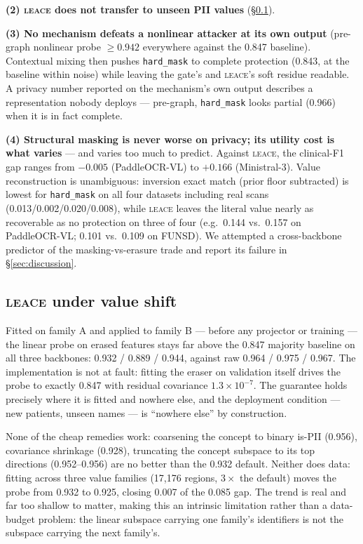 \documentclass[11pt]{article}
\newcommand{\hardmask}{\texttt{hard\_mask}}
\newcommand{\leace}{\textsc{leace}}
\begin{document}
\textbf{(2) \leace{} does not transfer to unseen PII values}
(\S\ref{sec:leacetransfer}).

\textbf{(3) No mechanism defeats a nonlinear attacker at its own output}
(pre-graph nonlinear probe $\geq 0.942$ everywhere against the 0.847
baseline). Contextual mixing then pushes \hardmask{} to complete protection
(0.843, at the baseline within noise) while leaving the gate's and
\leace{}'s soft residue readable. A privacy number reported on the
mechanism's own output describes a representation nobody deploys ---
pre-graph, \hardmask{} looks partial (0.966) when it is in fact complete.

\textbf{(4) Structural masking is never worse on privacy; its utility cost
is what varies} --- and varies too much to predict. Against \leace{}, the
clinical-F1 gap ranges from $-0.005$ (PaddleOCR-VL) to $+0.166$
(Ministral-3). Value reconstruction is unambiguous: inversion exact match
(prior floor subtracted) is lowest for \hardmask{} on all four datasets
including real scans (0.013/0.002/0.020/0.008), while \leace{} leaves the
literal value nearly as recoverable as no protection on three of four
(e.g.\ 0.144 vs.\ 0.157 on PaddleOCR-VL; 0.101 vs.\ 0.109 on FUNSD). We
attempted a cross-backbone predictor of the masking-vs-erasure trade and
report its failure in \S\ref{sec:discussion}.

\subsection{\leace{} under value shift}\label{sec:leacetransfer}

Fitted on family A and applied to family B --- before any projector or
training --- the linear probe on erased features stays far above the 0.847
majority baseline on all three backbones: 0.932 / 0.889 / 0.944, against raw
0.964 / 0.975 / 0.967. The implementation is not at fault: fitting the
eraser on validation itself drives the probe to exactly 0.847 with residual
covariance $1.3\times10^{-7}$. The guarantee holds precisely where it is
fitted and nowhere else, and the deployment condition --- new patients,
unseen names --- is ``nowhere else'' by construction.

None of the cheap remedies work: coarsening the concept to binary is-PII
(0.956), covariance shrinkage (0.928), truncating the concept subspace to
its top directions (0.952--0.956) are no better than the 0.932 default.
Neither does data: fitting across three value families (17{,}176 regions,
$3\times$ the default) moves the probe from 0.932 to 0.925, closing 0.007
of the 0.085 gap. The trend is real and far too shallow to matter, making
this an intrinsic limitation rather than a data-budget problem: the linear
subspace carrying one family's identifiers is not the subspace carrying the
next family's.
\end{document}
